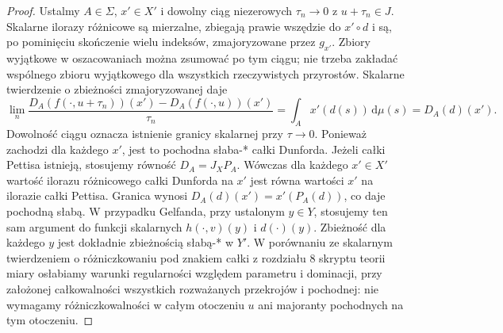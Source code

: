 \begin{proof}
Ustalmy $A\in\Sigma$, $x'\in X'$ i dowolny ciąg
niezerowych $\tau_n\to0$ z $u+\tau_n\in J$.
Skalarne ilorazy różnicowe są mierzalne,
zbiegają prawie wszędzie do $x'\circ d$ i są, po
pominięciu skończenie wielu indeksów, zmajoryzowane
przez $g_{x'}$. Zbiory wyjątkowe w oszacowaniach
można zsumować po tym ciągu; nie trzeba zakładać
wspólnego zbioru wyjątkowego dla wszystkich rzeczywistych
przyrostów. Skalarne twierdzenie o zbieżności
zmajoryzowanej daje
\[
 \lim_n\frac{D_A(f(\cdot,u+\tau_n))(x')
              -D_A(f(\cdot,u))(x')}{\tau_n}
 =\int_Ax'(d(s))\,\mathrm d\mu(s)=D_A(d)(x').
\]
Dowolność ciągu oznacza istnienie granicy skalarnej
przy $\tau\to0$. Ponieważ zachodzi dla każdego $x'$,
jest to pochodna słaba-* całki Dunforda.
Jeżeli całki Pettisa istnieją, stosujemy równość
$D_A=J_X P_A$. Wówczas dla każdego $x'\in X'$
wartość ilorazu różnicowego całki Dunforda na $x'$
jest równa wartości $x'$ na ilorazie całki Pettisa.
Granica wynosi $D_A(d)(x')=x'(P_A(d))$, co daje
pochodną słabą. W przypadku Gelfanda, przy ustalonym
$y\in Y$, stosujemy ten sam argument do funkcji
skalarnych $h(\cdot,v)(y)$ i $d(\cdot)(y)$.
Zbieżność dla każdego $y$ jest dokładnie zbieżnością
słabą-* w $Y'$. W porównaniu ze skalarnym twierdzeniem
o różniczkowaniu pod znakiem całki z rozdziału 8
skryptu teorii miary osłabiamy warunki regularności
względem parametru i dominacji, przy założonej
całkowalności wszystkich rozważanych przekrojów i pochodnej: nie wymagamy różniczkowalności
w całym otoczeniu $u$ ani majoranty pochodnych
na tym otoczeniu.
\end{proof}

